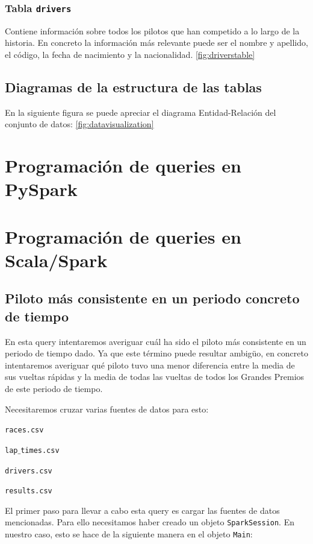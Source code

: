 \documentclass[12pt,twoside,titlepage]{report}
\begin{document}
\subsubsection{Tabla \texttt{drivers}}

Contiene información sobre todos los pilotos que han competido a lo largo de la historia. En concreto la información más relevante puede ser el nombre y apellido, el código, la fecha de nacimiento y la nacionalidad. \ref{fig:driverstable}

\subsection{Diagramas de la estructura de las tablas}

En la siguiente figura se puede apreciar el diagrama Entidad-Relación del conjunto de datos: \ref{fig:datavisualization}


\section{Programación de queries en PySpark}


\section{Programación de queries en Scala/Spark}

\subsection{Piloto más consistente en un periodo concreto de tiempo}
En esta query intentaremos averiguar cuál ha sido el piloto más consistente en un periodo de tiempo dado. Ya que este término puede resultar ambigüo, en concreto intentaremos averiguar qué piloto tuvo una menor diferencia entre la media de sus vueltas rápidas y la media de todas las vueltas de todos los Grandes Premios de este periodo de tiempo.

Necesitaremos cruzar varias fuentes de datos para esto: 

\begin{compactitem}
  \item \texttt{races.csv}
  \item \texttt{lap$\_$times.csv}
  \item \texttt{drivers.csv}
  \item \texttt{results.csv}
\end{compactitem}

El primer paso para llevar a cabo esta query es cargar las fuentes de datos mencionadas. Para ello necesitamos haber creado un objeto \texttt{SparkSession}. En nuestro caso, esto se hace de la siguiente manera en el objeto \texttt{Main}:
\end{document}
